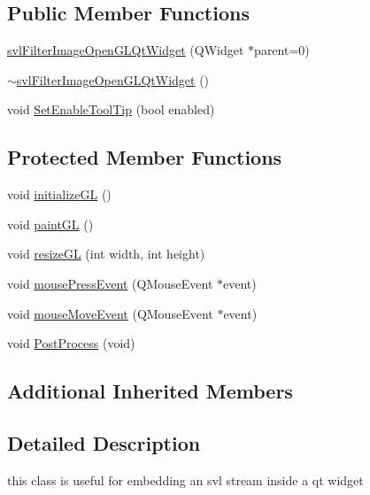 \subsection*{Public Member Functions}
\begin{DoxyCompactItemize}
\item 
\hyperlink{classsvl_filter_image_open_g_l_qt_widget_a0fd4cbb890ee25b373a976bd8ad742c7}{svl\+Filter\+Image\+Open\+G\+L\+Qt\+Widget} (Q\+Widget $\ast$parent=0)
\item 
\hyperlink{classsvl_filter_image_open_g_l_qt_widget_a9c55e170d300750fd00486c38d5381c9}{$\sim$svl\+Filter\+Image\+Open\+G\+L\+Qt\+Widget} ()
\item 
void \hyperlink{classsvl_filter_image_open_g_l_qt_widget_aa0dd538e8e279915eeaaee546fd9086c}{Set\+Enable\+Tool\+Tip} (bool enabled)
\end{DoxyCompactItemize}
\subsection*{Protected Member Functions}
\begin{DoxyCompactItemize}
\item 
void \hyperlink{classsvl_filter_image_open_g_l_qt_widget_ac8e99a2a2728e0e1492f2d499517fe3c}{initialize\+G\+L} ()
\item 
void \hyperlink{classsvl_filter_image_open_g_l_qt_widget_a9b2fcfe43542bcf8f0b124a44ab50f4c}{paint\+G\+L} ()
\item 
void \hyperlink{classsvl_filter_image_open_g_l_qt_widget_a3026b2e198323b23d2d9009b3d33c37b}{resize\+G\+L} (int width, int height)
\item 
void \hyperlink{classsvl_filter_image_open_g_l_qt_widget_ac7fe9e7030ba3585c79de282523ba85a}{mouse\+Press\+Event} (Q\+Mouse\+Event $\ast$event)
\item 
void \hyperlink{classsvl_filter_image_open_g_l_qt_widget_a827d374825864c23aaaf4b42794f7178}{mouse\+Move\+Event} (Q\+Mouse\+Event $\ast$event)
\item 
void \hyperlink{classsvl_filter_image_open_g_l_qt_widget_a7cf18eeadf63922000d94d366ea749d9}{Post\+Process} (void)
\end{DoxyCompactItemize}
\subsection*{Additional Inherited Members}


\subsection{Detailed Description}
this class is useful for embedding an svl stream inside a qt widget 

